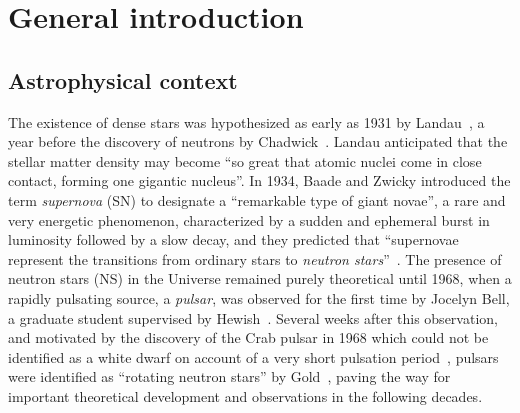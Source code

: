 \chapter*{General introduction}

%

\section*{Astrophysical context}

The existence of dense stars was hypothesized as early as 1931 
by Landau~\cite{Landau1932}, a year before the discovery of neutrons by
Chadwick~\cite{Chadwick1932}. 
Landau anticipated that the stellar matter density may become ``so great that 
atomic nuclei come in close contact, forming one gigantic 
nucleus''. 
In 1934, Baade and Zwicky introduced the term \textit{supernova} (SN) to 
designate a ``remarkable type of giant novae'', a rare and very energetic 
phenomenon, characterized by a sudden and ephemeral burst in luminosity 
followed by a slow decay, and they predicted that ``supernovae represent the 
transitions from ordinary stars to \textit{neutron stars}''~\cite{Baade1934}.
The presence of neutron stars (NS) in the Universe remained purely theoretical 
until 1968, when a rapidly pulsating source, a \textit{pulsar}, was observed 
for the first time by Jocelyn Bell, a graduate student supervised by 
Hewish~\cite{Hewish1968}. Several weeks after this observation, and motivated 
by the discovery of the Crab pulsar in 1968 which could not be identified as a 
white dwarf on account of a very short pulsation period~\cite{Comella1969}, 
pulsars were identified as ``rotating neutron stars'' by Gold~\cite{Gold1968}, 
paving the way for important theoretical development and observations in the 
following decades.


